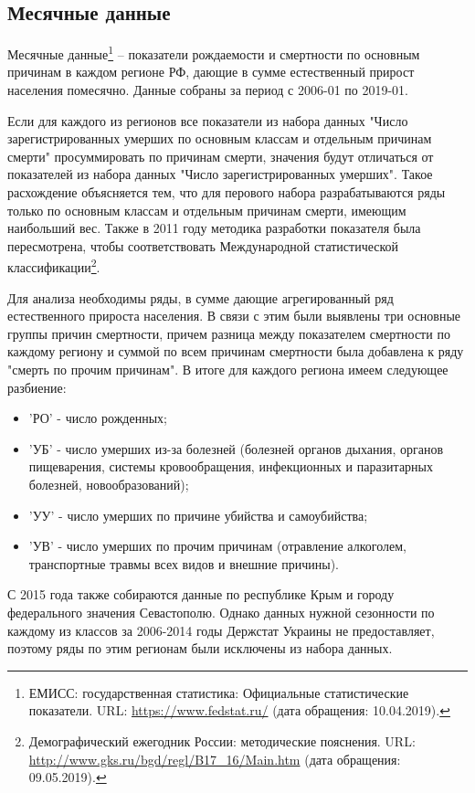 \documentclass[12pt,a4paper, oneside]{extreport}
\begin{document}
\subsection{Месячные данные}

Месячные данные\footnote{ЕМИСС: государственная статистика: Официальные статистические показатели. URL: \url{https://www.fedstat.ru/} (дата обращения: 10.04.2019).} -- показатели рождаемости и смертности по основным причинам  в каждом регионе РФ, дающие в сумме естественный прирост населения помесячно. 
Данные собраны за период с 2006-01 по 2019-01. 


Если для каждого из регионов все показатели из набора данных "Число зарегистрированных умерших по основным классам и отдельным причинам смерти" просуммировать по причинам смерти, значения будут отличаться от показателей  из набора данных "Число зарегистрированных умерших". Такое расхождение объясняется тем, что для перового набора  разрабатываются ряды только по   основным классам и отдельным причинам смерти, имеющим наибольший вес. Также в 2011 году методика разработки показателя была пересмотрена, чтобы соответствовать  Международной статистической классификации\footnote{Демографический ежегодник России: методические пояснения. URL: \url{http://www.gks.ru/bgd/regl/B17\_16/Main.htm} (дата обращения: 09.05.2019).}. 

Для анализа необходимы ряды, в сумме дающие агрегированный ряд естественного прироста населения.  В связи с этим  были выявлены три основные группы причин смертности, причем разница между показателем смертности по каждому региону и суммой по всем причинам смертности была добавлена к ряду "смерть по прочим причинам". В итоге для каждого региона имеем следующее разбиение:   



\begin{itemize}
	\item 'РО'  -  число рожденных;
	\item  'УБ' - число умерших  из-за болезней (болезней органов дыхания, органов пищеварения, системы кровообращения, инфекционных и паразитарных болезней, новообразований);
\item 'УУ'  -  число умерших по причине убийства и самоубийства;
\item 'УВ'  -  число умерших по прочим причинам (отравление алкоголем, транспортные травмы всех видов и внешние причины).

\end{itemize}


С 2015 года также собираются данные по республике Крым и городу федерального значения Севастополю. Однако данных нужной сезонности по каждому из классов за 2006-2014 годы Держстат Украины не предоставляет, поэтому ряды по этим регионам были исключены из набора данных. 
\end{document}
